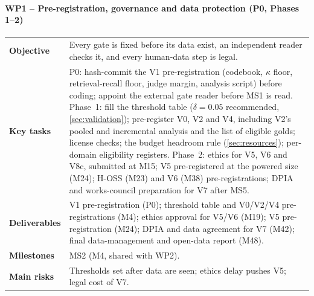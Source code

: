 \paragraph{WP1 -- Pre-registration, governance and data protection (P0, Phases 1--2)}
\mbox{}\par
\begin{tabularx}{\linewidth}{@{}>{\bfseries}p{2.6cm}X@{}}
  \toprule
  Objective & Every gate is fixed before its data exist, an independent reader checks it, and
    every human-data step is legal. \\
  Key tasks & P0: hash-commit the V1 pre-registration (codebook, $\kappa$ floor, retrieval-recall
    floor, judge margin, analysis script) before coding; appoint the external gate reader before
    MS1 is read. Phase~1: fill the threshold table ($\delta = 0.05$ recommended,
    \cref{sec:validation}); pre-register V0, V2 and V4, including V2's pooled and incremental
    analysis and the list of eligible golds; license checks; the budget headroom rule
    (\cref{sec:resources}); per-domain eligibility registers. Phase~2: ethics for V5, V6 and V8c,
    submitted at M15; V5 pre-registered at the powered size (M24); H-OSS (M23) and V6 (M38)
    pre-registrations; DPIA and works-council preparation for V7 after MS5. \\
  Deliverables & V1 pre-registration (P0); threshold table and V0/V2/V4 pre-registrations (M4);
    ethics approval for V5/V6 (M19); V5 pre-registration (M24); DPIA and data agreement for V7
    (M42); final data-management and open-data report (M48). \\
  Milestones & MS2 (M4, shared with WP2). \\
  Main risks & Thresholds set after data are seen; ethics delay pushes V5; legal cost of V7. \\
  \bottomrule
\end{tabularx}

